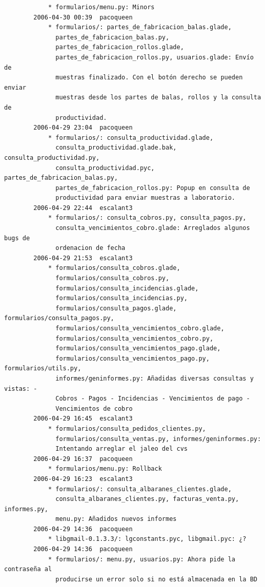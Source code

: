 \documentclass[a4paper]{article}
\begin{document}
\begin{verbatim}
            * formularios/menu.py: Minors
        2006-04-30 00:39  pacoqueen
            * formularios/: partes_de_fabricacion_balas.glade,
              partes_de_fabricacion_balas.py,
              partes_de_fabricacion_rollos.glade,
              partes_de_fabricacion_rollos.py, usuarios.glade: Envío de
              muestras finalizado. Con el botón derecho se pueden enviar
              muestras desde los partes de balas, rollos y la consulta de
              productividad.
        2006-04-29 23:04  pacoqueen
            * formularios/: consulta_productividad.glade,
              consulta_productividad.glade.bak, consulta_productividad.py,
              consulta_productividad.pyc, partes_de_fabricacion_balas.py,
              partes_de_fabricacion_rollos.py: Popup en consulta de
              productividad para enviar muestras a laboratorio.
        2006-04-29 22:44  escalant3
            * formularios/: consulta_cobros.py, consulta_pagos.py,
              consulta_vencimientos_cobro.glade: Arreglados algunos bugs de
              ordenacion de fecha
        2006-04-29 21:53  escalant3
            * formularios/consulta_cobros.glade,
              formularios/consulta_cobros.py,
              formularios/consulta_incidencias.glade,
              formularios/consulta_incidencias.py,
              formularios/consulta_pagos.glade, formularios/consulta_pagos.py,
              formularios/consulta_vencimientos_cobro.glade,
              formularios/consulta_vencimientos_cobro.py,
              formularios/consulta_vencimientos_pago.glade,
              formularios/consulta_vencimientos_pago.py, formularios/utils.py,
              informes/geninformes.py: Añadidas diversas consultas y vistas: -
              Cobros - Pagos - Incidencias - Vencimientos de pago -
              Vencimientos de cobro
        2006-04-29 16:45  escalant3
            * formularios/consulta_pedidos_clientes.py,
              formularios/consulta_ventas.py, informes/geninformes.py:
              Intentando arreglar el jaleo del cvs
        2006-04-29 16:37  pacoqueen
            * formularios/menu.py: Rollback
        2006-04-29 16:23  escalant3
            * formularios/: consulta_albaranes_clientes.glade,
              consulta_albaranes_clientes.py, facturas_venta.py, informes.py,
              menu.py: Añadidos nuevos informes
        2006-04-29 14:36  pacoqueen
            * libgmail-0.1.3.3/: lgconstants.pyc, libgmail.pyc: ¿?
        2006-04-29 14:36  pacoqueen
            * formularios/: menu.py, usuarios.py: Ahora pide la contraseña al
              producirse un error solo si no está almacenada en la BD

\end{verbatim}
\end{document}
